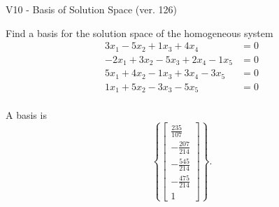 \begin{exercise}
  \begin{exerciseTitle}V10 - Basis of Solution Space (ver. 126)\end{exerciseTitle}
  \begin{exerciseStatement}
    Find a basis for the solution space of the homogeneous system 
\begin{align*}
 3 x_ 1 -5 x_ 2 + 1 x_ 3 + 4 x_ 4 &= 0  \\ 
  -2 x_ 1 + 3 x_ 2 -5 x_ 3 + 2 x_ 4 -1 x_ 5 &= 0  \\ 
  5 x_ 1 + 4 x_ 2 -1 x_ 3 + 3 x_ 4 -3 x_ 5 &= 0  \\ 
  1 x_ 1 + 5 x_ 2 -3 x_ 3 -5 x_ 5 &= 0  \\ 
 \end{align*}


 
  \end{exerciseStatement}

  \begin{exerciseAnswer}
   A basis is   
\[\left\{\left[\begin{array}{c}
\frac{235}{107} \\
-\frac{207}{214} \\
-\frac{545}{214} \\
-\frac{475}{214} \\
1
\end{array}\right]\right\}.\]

  


  \end{exerciseAnswer}
\end{exercise}